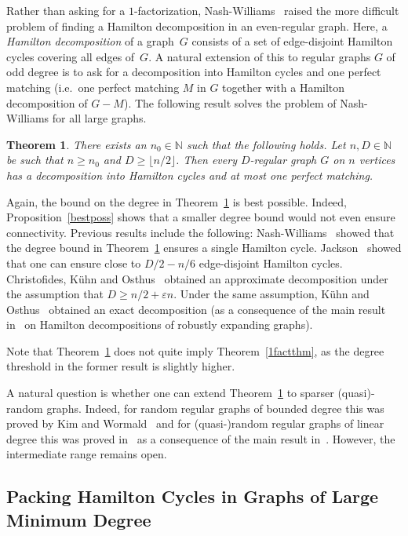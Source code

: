\documentclass{memo-l}
\newtheorem{thm}[firstthm]{Theorem}
\def\eps{\varepsilon}
\numberwithin{section}{chapter}
\numberwithin{equation}{section}
\numberwithin{firstthm}{section}
\numberwithin{figure}{section}
\begin{document}
Rather than asking for a $1$-factorization, Nash-Williams~\cite{initconj,decompconj} raised the
more difficult problem of finding a Hamilton decomposition 
in an even-regular graph.
Here, a \emph{Hamilton decomposition} of a graph~$G$ consists of a set of edge-disjoint Hamilton cycles covering all edges of~$G$.
A natural extension of this to regular graphs $G$ of odd degree is to ask for a decomposition into 
Hamilton cycles and one perfect matching (i.e.~one perfect matching $M$ in $G$ together with a 
Hamilton decomposition of $G-M$). The following result solves the problem of Nash-Williams for all large graphs.
\begin{thm} \label{HCDthm} 
There exists an $n_0 \in \mathbb N$ such that the following holds.
Let $ n,D \in \mathbb N$ be such that $n \geq n_0$ and
$D \ge   \lfloor n/2 \rfloor $.
Then every $D$-regular graph $G$ on $n$ vertices has a decomposition into Hamilton cycles and 
at most one perfect matching.
\end{thm}
Again, the bound on the degree in Theorem~\ref{HCDthm} is best possible. 
Indeed, Proposition~\ref{bestposs} shows that a smaller degree bound would not even ensure connectivity.
Previous results include the following:
Nash-Williams~\cite{NWreg} showed that the degree bound in Theorem~\ref{HCDthm} ensures a single Hamilton cycle.
Jackson~\cite{Jackson79} showed that one can ensure close to $D/2-n/6$ edge-disjoint Hamilton cycles.
Christofides, K\"uhn and Osthus~\cite{CKO} obtained an approximate decomposition under the assumption that $D \ge n/2 +\eps n$.
Under the same assumption, K\"uhn and Osthus~\cite{KellyII} obtained an exact decomposition
(as a consequence of the main result in~\cite{Kelly} on Hamilton decompositions of robustly expanding graphs). 


Note that Theorem~\ref{HCDthm} does not quite imply Theorem~\ref{1factthm},
as the degree threshold in the former result is slightly higher.

A natural question is whether one can extend Theorem~\ref{HCDthm} to sparser (quasi)-random
graphs. Indeed, for random regular graphs of bounded degree this was proved by Kim and Wormald~\cite{KW01}
and for (quasi-)random regular graphs of linear degree this was proved in~\cite{KellyII} as a consequence of
the main result in~\cite{Kelly}. However, the intermediate range remains open.

\subsection{Packing Hamilton Cycles in Graphs of Large Minimum Degree}
\end{document}
